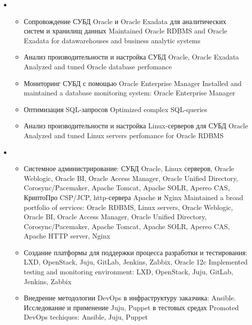 \documentclass[11pt,a4paper,sans, russian]{moderncv}        %
\begin{document}
{\begin{itemize}
\begin{itemize}
		\end{itemize}
	\item {}
		\begin{itemize}
			\item {}
				{Сопровождение СУБД Oracle и Oracle Exadata для аналитических систем и хранилищ данных}
				{Maintained Oracle RDBMS and Oracle Exadata for datawarehouses and business analytic systems}
			\item {}
				{Анализ производительности и настройка СУБД Oracle, Oracle Exadata}
				{Analyzed and tuned Oracle database perfomance}
			\item {}
				{Мониторинг СУБД с помощью Oracle Enterprise Manager}
				{Installed and maintained a database monitoring system: Oracle Enterprise Manager}
			\item {}
				{Оптимизация SQL-запросов}
				{Optimized complex SQL-queries}
			\item {}
				{Анализ производительности и настройка Linux-серверов для СУБД Oracle}
				{Analyzed and tuned Linux servers perfomance for Oracle RDBMS}
		\end{itemize}
	\item {}
		\begin{itemize}
			\item {}
				{Системное администрирование: СУБД Oracle, Linux серверов, Oracle Weblogic, Oracle BI, Oracle Access Manager, Oracle Unified Directory,
				Corosync/Pacemaker, Apache Tomcat, Apache SOLR, Apereo CAS, КриптоПро CSP/JCP, http-сервера Apache и Nginx}
				{Maintained a broad portfolio of services: Oracle RDBMS, Linux servers, Oracle Weblogic, Oracle BI, Oracle Access Manager, Oracle Unified Directory, Corosync/Pacemaker, Apache Tomcat, Apache SOLR, Apereo CAS, Apache HTTP server, Nginx}
			\item {}
				{Создание платформы для поддержки процесса разработки и тестирования: LXD, OpenStack, Juju, GitLab, Jenkins, Zabbix, Oracle 12c}
				{Implemented testing and monitoring environment: LXD, OpenStack, Juju, GitLab, Jenkins, Zabbix}
			\item {}
				{Внедрение методологии DevOps в инфраструктуру заказчика: Ansible. Исследование и применение Juju, Puppet в тестовых средах}
				{Promoted DevOps techiques: Ansible, Juju, Puppet}

\end{itemize}
\end{itemize}}
\end{document}
